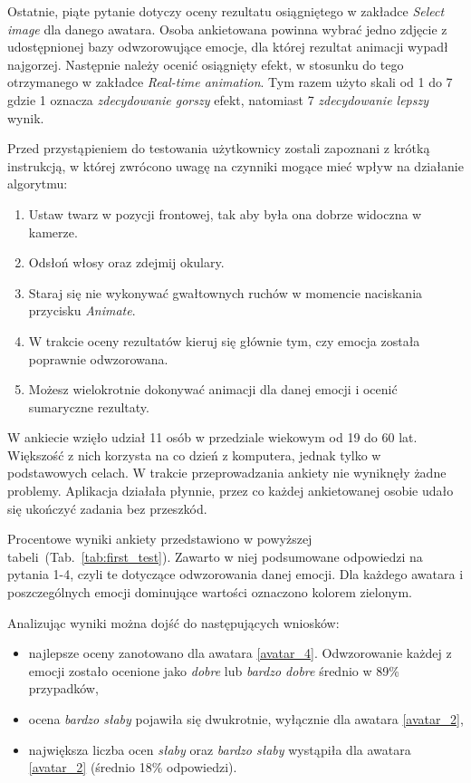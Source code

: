 Ostatnie, piąte pytanie dotyczy oceny rezultatu osiągniętego w zakładce \textit{Select image} dla danego awatara. Osoba ankietowana powinna wybrać jedno zdjęcie z udostępnionej bazy odwzorowujące emocje, dla której rezultat animacji wypadł najgorzej. Następnie należy ocenić osiągnięty efekt, w stosunku do tego otrzymanego w zakładce \textit{Real-time animation}. Tym razem użyto skali od 1 do 7 gdzie 1 oznacza \textit{zdecydowanie gorszy} efekt, natomiast 7 \textit{zdecydowanie lepszy} wynik.

Przed przystąpieniem do testowania użytkownicy zostali zapoznani z krótką instrukcją, w której zwrócono uwagę na czynniki mogące mieć wpływ na działanie algorytmu:

\begin{enumerate}
    \item Ustaw twarz w pozycji frontowej, tak aby była ona dobrze widoczna w kamerze.
    \item Odsłoń włosy oraz zdejmij okulary.
    \item Staraj się nie wykonywać gwałtownych ruchów w momencie naciskania przycisku \textit{Animate}.
    \item W trakcie oceny rezultatów kieruj się głównie tym, czy emocja została poprawnie odwzorowana.
    \item Możesz wielokrotnie dokonywać animacji dla danej emocji i ocenić sumaryczne rezultaty.
\end{enumerate}

W ankiecie wzięło udział 11 osób w przedziale wiekowym od 19 do 60 lat. Większość z nich korzysta na co dzień z komputera, jednak tylko w podstawowych celach. W trakcie przeprowadzania ankiety nie wyniknęły żadne problemy. Aplikacja działała płynnie, przez co każdej ankietowanej osobie udało się ukończyć zadania bez przeszkód.

Procentowe wyniki ankiety przedstawiono w powyższej tabeli~(Tab.~\ref{tab:first_test}). Zawarto w niej podsumowane odpowiedzi na pytania 1-4, czyli te dotyczące odwzorowania danej emocji. Dla każdego awatara i poszczególnych emocji dominujące wartości oznaczono kolorem zielonym. 

Analizując wyniki można dojść do następujących wniosków:
\begin{itemize}
    \item najlepsze oceny zanotowano dla awatara \ref{avatar_4}. Odwzorowanie każdej z emocji zostało ocenione jako \textit{dobre} lub \textit{bardzo dobre} średnio w 89\% przypadków,
    \item ocena \textit{bardzo słaby} pojawiła się dwukrotnie, wyłącznie dla awatara \ref{avatar_2},
    \item największa liczba ocen \textit{słaby} oraz \textit{bardzo słaby} wystąpiła dla awatara \ref{avatar_2} (średnio 18\% odpowiedzi).
\end{itemize}

